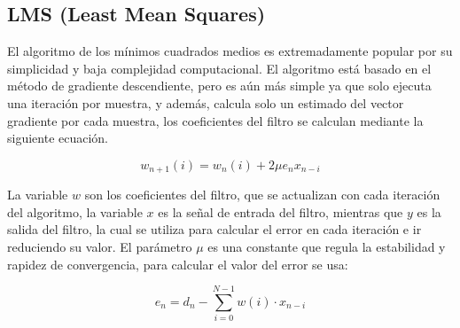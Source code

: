 \documentclass[a4paper,12pt]{article} %
\begin{document}
\begin{center}
    \section*{LMS (Least Mean Squares)}
\end{center}

El algoritmo de los mínimos cuadrados medios es extremadamente popular por su simplicidad y baja complejidad computacional. El algoritmo está basado en el método de gradiente descendiente, pero es aún más simple ya que solo ejecuta una iteración por muestra, y además, calcula solo un estimado del vector gradiente por cada muestra, los coeficientes del filtro se calculan mediante la siguiente ecuación.

\begin{equation}
    w_{n+1}(i) = w_n (i) + 2 \mu e_n x_{n-i}
\end{equation}

La variable $w$ son los coeficientes del filtro, que se actualizan con cada iteración del algoritmo, la variable $x$ es la señal de entrada del filtro, mientras que $y$ es la salida del filtro, la cual se utiliza para calcular el error en cada iteración e ir reduciendo su valor. El parámetro $\mu$ es una constante que regula la estabilidad y rapidez de convergencia, para calcular el valor del error se usa:

\begin{equation}
    e_n = d_n - \sum\limits_{i=0}^{N-1} w(i) \cdot x_{n-i}
\end{equation}
\end{document}

